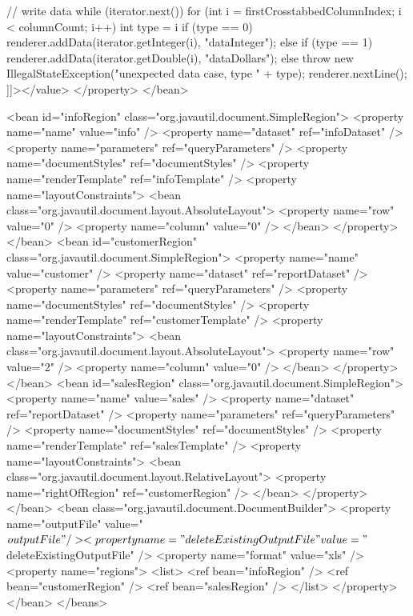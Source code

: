 \documentclass[letterpaper,10pt]{article}
\begin{document}
\begin{verbatimtab}
	// write data	
	while (iterator.next()) {
		for (int i = firstCrosstabbedColumnIndex; i < columnCount; i++) {
		int type = i %
		if (type == 0) {
			renderer.addData(iterator.getInteger(i), "dataInteger");			
		} else if (type == 1) {
			renderer.addData(iterator.getDouble(i), "dataDollars");
		} else {
			throw new IllegalStateException("unexpected data case, type " + type);
		}
	}
		renderer.nextLine();
	}
		]]></value>
	</property>
</bean>

<bean id="infoRegion" class="org.javautil.document.SimpleRegion">
	<property name="name" value="info" />
	<property name="dataset" ref="infoDataset" />
	<property name="parameters" ref="queryParameters" />
	<property name="documentStyles" ref="documentStyles" />
	<property name="renderTemplate" ref="infoTemplate" />
	<property name="layoutConstraints">
		<bean class="org.javautil.document.layout.AbsoluteLayout">
			<property name="row" value="0" />
			<property name="column" value="0" />
		</bean>
	</property>
</bean>
<bean id="customerRegion" class="org.javautil.document.SimpleRegion">
	<property name="name" value="customer" />
	<property name="dataset" ref="reportDataset" />
	<property name="parameters" ref="queryParameters" />
	<property name="documentStyles" ref="documentStyles" />
	<property name="renderTemplate" ref="customerTemplate" />
	<property name="layoutConstraints">
		<bean class="org.javautil.document.layout.AbsoluteLayout">
			<property name="row" value="2" />
			<property name="column" value="0" />
		</bean>
	</property>
</bean>
<bean id="salesRegion" class="org.javautil.document.SimpleRegion">
	<property name="name" value="sales" />
	<property name="dataset" ref="reportDataset" />
	<property name="parameters" ref="queryParameters" />
	<property name="documentStyles" ref="documentStyles" />
	<property name="renderTemplate" ref="salesTemplate" />
	<property name="layoutConstraints">
		<bean class="org.javautil.document.layout.RelativeLayout">
			<property name="rightOfRegion" ref="customerRegion" />
		</bean>
	</property>
</bean>
<bean class="org.javautil.document.DocumentBuilder">
	<property name="outputFile" value="${outputFile}" />
	<property name="deleteExistingOutputFile" value="${deleteExistingOutputFile}" />
	<property name="format" value="xls" />
	<property name="regions">
		<list>
			<ref bean="infoRegion" />
			<ref bean="customerRegion" />
			<ref bean="salesRegion" />
		</list>
	</property>
</bean>
</beans>
\end{verbatimtab}
\end{document}

